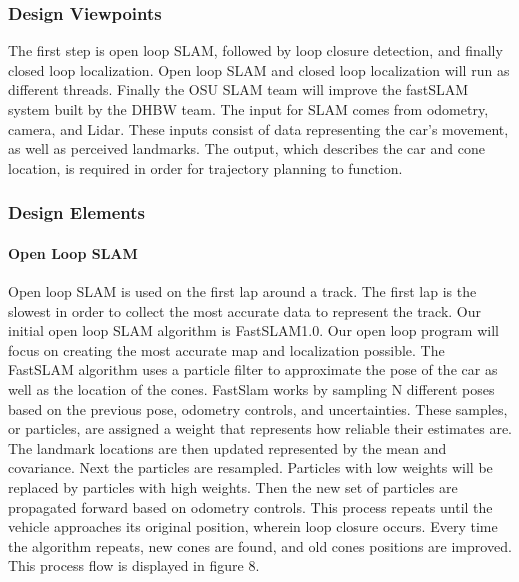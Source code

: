 \documentclass[10pt, onecolumn, draftclsnofoot, letterpaper,compsoc]{IEEEtran}
\begin{document}
\subsubsection{Design Viewpoints} %
The first step is open loop SLAM, followed by loop closure detection, and finally closed loop localization. Open loop SLAM and closed loop localization will run as different threads. Finally the OSU SLAM team will improve the fastSLAM system built by the DHBW team. The input for SLAM comes from odometry, camera, and Lidar. These inputs consist of data representing the car's movement, as well as perceived landmarks. The output, which describes the car and cone location, is required in order for trajectory planning to function. 


\subsubsection{Design Elements} %
\paragraph{Open Loop SLAM} 
Open loop SLAM is used on the first lap around a track. The first lap is the slowest in order to collect the most accurate data to represent the track. Our initial open loop SLAM algorithm is FastSLAM1.0. Our open loop program will focus on creating the most accurate map and localization possible. The FastSLAM algorithm uses a particle filter to approximate the pose of the car as well as the location of the cones. FastSlam works by sampling N different poses based on the previous pose, odometry controls, and uncertainties. These samples, or particles, are assigned a weight that represents how reliable their estimates are. The landmark locations are then updated represented by the mean and covariance. Next the particles are resampled. Particles with low weights will be replaced by particles with high weights. Then the new set of particles are propagated forward based on odometry controls. This process repeats until the vehicle approaches its original position, wherein loop closure occurs. Every time the algorithm repeats, new cones are found, and old cones positions are improved. This process flow is displayed in figure 8.
\end{document}
